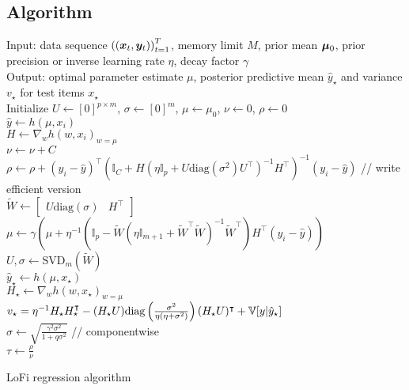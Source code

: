 \subsection{Algorithm}

\begin{algorithm}
Input: data sequence $\left(\left({\bm{x}}_{t},{\bm{y}}_{t}\right)\right)_{t=1}^{T}$,
memory limit $M$, prior mean $\boldsymbol{\mu}_{0}$, prior precision or inverse learning rate $\eta$, decay factor $\gamma$ \\
Output:  optimal parameter estimate $\mu$, posterior predictive mean $\hat{y}_\star$ and variance $v_\star$ for test items $x_\star$ \\
Initialize $U\leftarrow\left[0\right]^{p\times m}$, $\sigma\leftarrow\left[0\right]^{m}$,
$\mu\leftarrow\mu_{0}$, $\nu\leftarrow0$, $\rho\leftarrow0$ \\
 {
$\hat{y}\leftarrow h\left(\mu,x_{i}\right)$ \\
$H\leftarrow\nabla_{w}h\left(w,x_{i}\right)_{w=\mu}$ \\
$\nu\leftarrow\nu+C$ \\
$\rho\leftarrow\rho+(y_i-\hat{y})^{\top}(\mathbb{I}_C+H\left(\eta\mathbb{I}_{p}+U\text{diag}(\sigma^2)U^{\top}\right)^{-1}H^{\top})^{-1}(y_i-\hat{y})$ // write efficient version\\
$\tilde{W}\leftarrow\left[\begin{array}{cc}U\text{diag}(\sigma) & H^{\top}\end{array}\right]$ \\
$\mu\leftarrow\gamma\left(\mu+\eta^{-1}\left(\mathbb{I}_{p}-\tilde{W}\left(\eta\mathbb{I}_{m+1}+\tilde{W}^{\top}\tilde{W}\right)^{-1}\tilde{W}^{\top}\right)H^{\top}\left(y_{i}-\hat{y}\right)\right)$ \\
$U,\sigma\leftarrow{\mathrm{SVD}}_m(\tilde{W})$ \\
 {
$\hat{y}_\star \leftarrow h(\mu,x_\star)$ \\
$H_\star\leftarrow\nabla_{w}h\left(w,x_\star\right)_{w=\mu}$ \\
$v_\star = \eta^{-1}H_\star H_\star^\intercal - (H_\star U) \mathrm{diag}\left(\frac{\sigma^2}{\eta(\eta+\sigma^2)}\right) (H_\star U)^\intercal + \mathbb{V}[y|\hat{y}_\star]$\\
}
$\sigma\leftarrow\sqrt{\frac{\gamma^{2}\sigma^{2}}{1+q\sigma^{2}}}$ // componentwise \\
}
$\tau\leftarrow\frac{\rho}{\nu}$
\caption{\label{alg:LoFi-full-SVD}LoFi regression algorithm}
\end{algorithm}

